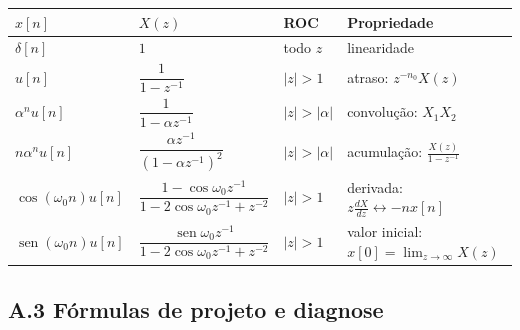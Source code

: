 \begin{center}
\begin{tabular}{ll@{\qquad}ll}
\toprule
$x[n]$ & $X(z)$ & ROC & Propriedade\\
\midrule
$\delta[n]$ & $1$ & todo $z$ & linearidade\\
$u[n]$ & $\dfrac{1}{1-z^{-1}}$ & $|z|>1$ & atraso: $z^{-n_0}X(z)$\\
$\alpha^{n}u[n]$ & $\dfrac{1}{1-\alpha z^{-1}}$ & $|z|>|\alpha|$ & convolução: $X_1X_2$\\
$n\alpha^{n}u[n]$ & $\dfrac{\alpha z^{-1}}{(1-\alpha z^{-1})^2}$ & $|z|>|\alpha|$ & acumulação: $\frac{X(z)}{1-z^{-1}}$\\
$\cos(\omega_0n)u[n]$ & $\dfrac{1-\cos\omega_0z^{-1}}{1-2\cos\omega_0z^{-1}+z^{-2}}$ & $|z|>1$ & derivada: $z\frac{dX}{dz}\leftrightarrow -nx[n]$\\
$\operatorname{sen}(\omega_0n)u[n]$ & $\dfrac{\operatorname{sen}\omega_0z^{-1}}{1-2\cos\omega_0z^{-1}+z^{-2}}$ & $|z|>1$ & valor inicial: $x[0]=\lim_{z\to\infty}X(z)$\\
\bottomrule
\end{tabular}
\end{center}

\subsection*{A.3 Fórmulas de projeto e diagnose}

